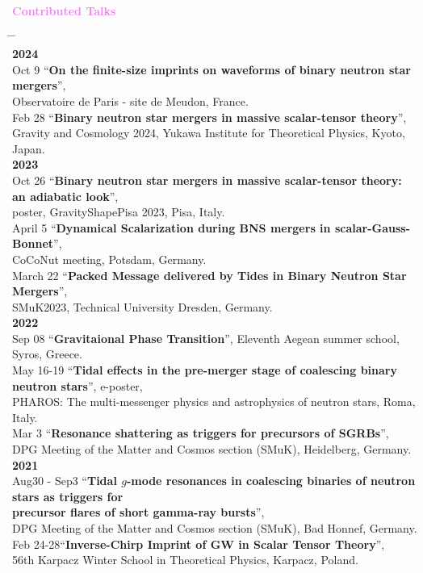 \documentclass[10pt,floatfix,a4paper]{article}
\begin{document}
{\large \bf \textcolor{Violet}{Contributed Talks}}
\begin{tabbing}
  \hspace*{5mm} \= \hspace*{2cm} \= \hspace*{10cm} \\[-3ex]
  \> {\bf 2024} \> \\[1ex]
  \> Oct 9 \> ``\textbf{On the finite-size imprints on waveforms of binary neutron star mergers}'',\\
  \> \> Observatoire de Paris - site de Meudon, France. \\  
  \> Feb 28 \> ``\textbf{Binary neutron star mergers in massive scalar-tensor theory}'',\\
  \> \> Gravity and Cosmology 2024, Yukawa Institute for Theoretical Physics, Kyoto, Japan.\\
  \> {\bf 2023} \> \\[1ex]
  \> Oct 26 \> ``\textbf{Binary neutron star mergers in massive scalar-tensor theory: an
  adiabatic look}'', \\
  \> \> poster, GravityShapePisa 2023, Pisa, Italy.\\
  \> April 5 \> ``\textbf{Dynamical Scalarization during BNS mergers
  in scalar-Gauss-Bonnet}'', \\
  \> \> CoCoNut meeting, Potsdam, Germany.\\
  \> March 22 \> ``\textbf{Packed Message delivered by Tides in
  Binary Neutron Star Mergers}'', \\
  \> \> SMuK2023, Technical University Dresden, Germany.\\
  \> {\bf 2022} \> \\[1ex]
  \> Sep 08 \> ``\textbf{Gravitaional Phase Transition}'', Eleventh Aegean summer school, Syros, Greece.\\
  \> May 16-19 \> ``\textbf{Tidal effects in the pre-merger stage of coalescing binary neutron stars}'', e-poster, \\
  \> \> PHAROS: The multi-messenger physics and astrophysics of neutron stars, Roma, Italy.\\
  \> Mar 3 \> ``\textbf{Resonance shattering as triggers for precursors of SGRBs}'', \\
  \> \> DPG Meeting of the Matter and Cosmos section (SMuK), Heidelberg, Germany.\\
  \> {\bf 2021} \> \\[1ex]
  \> Aug30 - Sep3 \> ``\textbf{Tidal $g$-mode resonances in coalescing binaries of neutron stars as triggers for}\\
  \> \> \textbf{precursor flares of short gamma-ray bursts}'', \\ 
  \> \> DPG Meeting of the Matter and Cosmos section (SMuK), Bad Honnef, Germany. \\
  \> Feb 24-28\>``\textbf{Inverse-Chirp Imprint of GW in Scalar Tensor Theory}'', \\ 
  \> \> 56th Karpacz Winter School in Theoretical Physics, Karpacz, Poland.
\end{tabbing}
\end{document}
